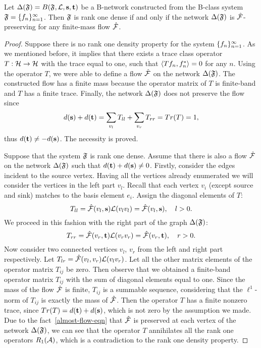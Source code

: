 \documentclass[12pt]{amsart}
\begin{document}
    \begin{theorem}
      \label{thm-graph-eq}
        Let $\net(\fsys) = B(\fsys, \len, \source, \sink)$ be a B-network constructed
          from the B-class system $\fsys = \seq{f}$.
        Then $\fsys$ is rank one dense if and only if
          the network $\net(\fsys)$ is $\flow$-preserving for any finite-mass flow $\flow$.
    \end{theorem}
    \begin{proof}
      Suppose there is no rank one density property for the system $\seq{f}$.
      As we mentioned before, it implies that there exists a trace class operator $T: \cal{H} \to \cal{H}$ with
        the trace equal to one, such that $\inner{Tf_n}{f_n^*} = 0$ for any $n$.
      Using the operator $T$, we were able to define a flow $\flow$ on the network $\net(\fsys)$.
      The constructed flow has a finite mass because the operator matrix of $T$ is finite-band and $T$ has a finite trace.
      Finally, the network $\net(\fsys)$ does not preserve the flow since
      \[
        d(\source) + d(\sink) = \sum_{v_l} T_{ll} + \sum_{v_r} T_{rr} = Tr(T) = 1,
      \]
      thus $d(\sink) \neq -d(\source)$.
      The necessity is proved.

      Suppose that the system $\fsys$ is rank one dense.
      Assume that there is also a flow $\flow$ on the network $\net(\fsys)$ such that $d(\sink) + d(\source) \neq 0$.
      Firstly, consider the edges incident to the source vertex.
      Having all the vertices already enumerated we will consider the vertices in the left part $v_{l}$.
      Recall that each vertex $v_i$ (except source and sink) matches to the basis element $e_i$.
      Assign the diagonal elements of $T$:
      \[
        T_{ll} = \flow(v_l, \source) \len(v_l v_l) = \flow(v_l, \source), \quad l > 0.
      \]
      We proceed in this fashion with the right part of the graph $\net(\fsys)$:
      \[
        T_{rr} = \flow(v_r, \sink) \len(v_r v_r) = \flow(v_r, \sink), \quad r > 0.
      \]
      Now consider two connected vertices $v_l$, $v_r$ from the left and right part respectively.
      Let $T_{lr} = \flow(v_l, v_r) \len(v_l  v_r)$.
      Let all the other matrix elements of the operator matrix $T_{ij}$ be zero.
      Then observe that we obtained a finite-band operator matrix $T_{ij}$ with the sum of diagonal elements equal to one.
      Since the mass of the flow $\flow$ is finite, $T_{ij}$ is a summable sequence, considering that
        the $\ell^1$-norm of $T_{ij}$ is exactly the mass of $\flow$.
      Then the operator $T$ has a finite nonzero trace, since $Tr(T) = d(\sink) + d(\source)$, which is not zero
        by the assumption we made.
      Due to the fact~\eqref{almost-flow-eqn} that $\flow$ is preserved at each vertex of the network $\net(\fsys)$,
        we can see that the operator $T$ annihilates all the rank one operators $R_1(\cal{A})$,
        which is a contradiction to the rank one density property.
    \end{proof}
\end{document}
